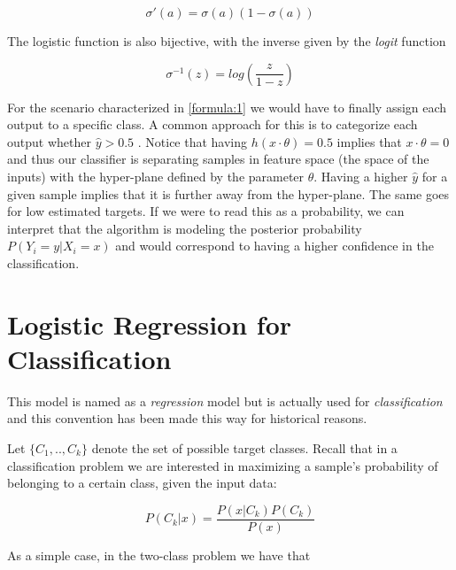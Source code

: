 \begin{equation} \label{eq:derivativeLogisticFunction}
\sigma '(a) = \sigma(a)( 1 - \sigma(a) )
\end{equation}

The logistic function is also bijective, with the inverse given by the \textit{logit} function

\begin{equation} \label{eq:logitFunction}
\sigma^{-1}(z)  = log( \frac{z}{1 - z})
\end{equation}

For the scenario characterized in \ref{formula:1} we would have to finally assign each output to a specific class. A common approach for this is to categorize each output whether $\hat{y} > 0.5$ \label{formula:logitThreshold}. Notice that having $h(x \cdot \theta) = 0.5$ implies that $x \cdot  \theta = 0$ and thus our classifier is separating samples in feature space (the space of the inputs) with the hyper-plane defined by the parameter $\theta$. Having a higher $\hat{y}$ for a given sample implies that it is further away from the hyper-plane. The same goes for low estimated targets. If we were to read this as a probability, we can interpret that the algorithm is modeling the posterior probability $P(Y_i = y | X_i = x)$ and would correspond to having a higher confidence in the classification.




\section{Logistic Regression for Classification}\label{section-logisticRegression}

This model is named as a \textit{regression} model but is actually used for \textit{classification} and this convention has been made this way for historical reasons.


Let $\{C_1,..,C_k\}$ denote the set of possible target classes. Recall that in a classification problem we are  interested in maximizing a sample's probability of belonging to a certain class, given the input data:

\begin{equation}
P(C_k| x) = \frac{P(x|C_k)P(C_k)}{P(x)} 
\end{equation}

As a simple case, in the two-class problem we have that


